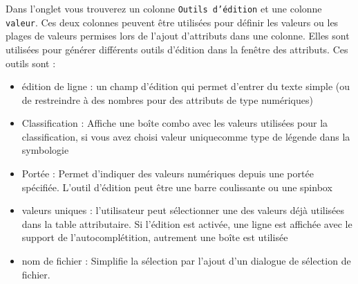 Dans l'onglet  vous trouverez un colonne \texttt{Outils d'édition} et une colonne \texttt{valeur}. Ces deux colonnes peuvent être utilisées pour définir les valeurs ou les plages de valeurs permises lors de l'ajout d'attributs dans une colonne. Elles sont utilisées pour générer différents outils d'édition dans la fenêtre des attributs. Ces outils sont :
\begin{itemize}[label=--]
\item édition de ligne : un champ d'édition qui permet d'entrer du texte simple (ou de restreindre à des nombres pour des attributs de type numériques)
\item Classification : Affiche une boîte combo avec les valeurs utilisées pour la classification, si vous avez choisi \og valeur unique\fg comme type de légende dans la symbologie
\item Portée : Permet d'indiquer des valeurs numériques depuis une portée spécifiée. L'outil d'édition peut être une barre coulissante ou une spinbox
\item valeurs uniques : l'utilisateur peut sélectionner une des valeurs déjà utilisées dans la table attributaire. Si l'édition est activée, une ligne est affichée avec le support de l'autocomplétition, autrement une boîte est utilisée
\item nom de fichier : Simplifie la sélection par l'ajout d'un dialogue de sélection de fichier.

\end{itemize}
